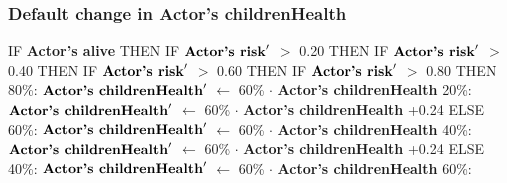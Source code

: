 \documentclass{article}%
\begin{document}
\subsubsection{Default change in Actor's childrenHealth}%
\label{ssubsec:Default change in Actor's childrenHealth}%
\begin{flushleft}%
IF %
\textbf{Actor's alive}%
\linebreak%
\hspace*{2em}%
THEN %
IF %
$\mbox{\textbf{Actor's risk}} '$%
$>$%
0.20%
\linebreak%
\hspace*{4em}%
THEN %
IF %
$\mbox{\textbf{Actor's risk}} '$%
$>$%
0.40%
\linebreak%
\hspace*{6em}%
THEN %
IF %
$\mbox{\textbf{Actor's risk}} '$%
$>$%
0.60%
\linebreak%
\hspace*{8em}%
THEN %
IF %
$\mbox{\textbf{Actor's risk}} '$%
$>$%
0.80%
\linebreak%
\hspace*{10em}%
THEN %
\linebreak%
\hspace*{12em}%
80\%: %
$\mbox{\textbf{Actor's childrenHealth}} '$%
$\leftarrow$%
60\%%
$\cdot$%
\textbf{Actor's childrenHealth}%
\linebreak%
\hspace*{12em}%
20\%: %
$\mbox{\textbf{Actor's childrenHealth}} '$%
$\leftarrow$%
60\%%
$\cdot$%
\textbf{Actor's childrenHealth}%
+0.24%
\linebreak%
\hspace*{10em}%
ELSE %
\linebreak%
\hspace*{12em}%
60\%: %
$\mbox{\textbf{Actor's childrenHealth}} '$%
$\leftarrow$%
60\%%
$\cdot$%
\textbf{Actor's childrenHealth}%
\linebreak%
\hspace*{12em}%
40\%: %
$\mbox{\textbf{Actor's childrenHealth}} '$%
$\leftarrow$%
60\%%
$\cdot$%
\textbf{Actor's childrenHealth}%
+0.24%
\linebreak%
\hspace*{8em}%
ELSE %
\linebreak%
\hspace*{10em}%
40\%: %
$\mbox{\textbf{Actor's childrenHealth}} '$%
$\leftarrow$%
60\%%
$\cdot$%
\textbf{Actor's childrenHealth}%
\linebreak%
\hspace*{10em}%
60\%: %

\end{flushleft}
\end{document}
